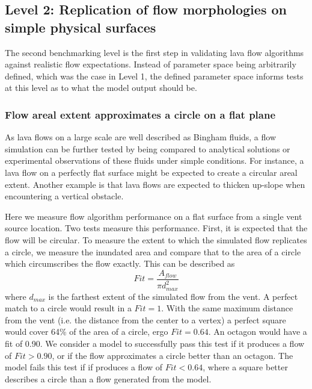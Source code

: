 \documentclass[12pt,letter]{article}
\begin{document}
	\subsection{Level 2: Replication of flow morphologies on simple physical surfaces}
	
	The second benchmarking level is the first step in validating lava flow algorithms against realistic flow expectations. Instead of parameter space being arbitrarily defined, which was the case in Level 1, the defined parameter space informs tests at this level as to what the model output should be.
	
		\subsubsection{Flow areal extent approximates a circle on a flat plane}\label{test:Bing_circ}
		
			As lava flows on a large scale are well described as Bingham fluids, a flow simulation can be further tested by being compared to analytical solutions or experimental observations of these fluids under simple conditions. For instance, a lava flow on a perfectly flat surface might be expected to create a circular areal extent. Another example is that lava flows are expected to thicken up-slope when encountering a vertical obstacle.
	
			Here we measure flow algorithm performance on a flat surface from a single vent source location. Two tests measure this performance. First, it is expected that the flow will be circular. To measure the extent to which the simulated flow replicates a circle, we measure the inundated area and compare that to the area of a circle which circumscribes the flow exactly. This can be described as
			\begin{equation}
				Fit = \frac{A_{flow}}{\pi d_{max}^2}
			\end{equation}
			where $d_{max}$ is the farthest extent of the simulated flow from the vent. A perfect match to a circle would result in a $Fit=1$. With the same maximum distance from the vent (i.e. the distance from the center to a vertex) a perfect square would cover 64\% of the area of a circle, ergo $Fit=0.64$. An octagon would have a fit of 0.90. We consider a model to successfully pass this test if it produces a flow of $Fit>0.90$, or if the flow approximates a circle better than an octagon. The model fails this test if if produces a flow of $Fit<0.64$, where a square better describes a circle than a flow generated from the model.
\end{document}

